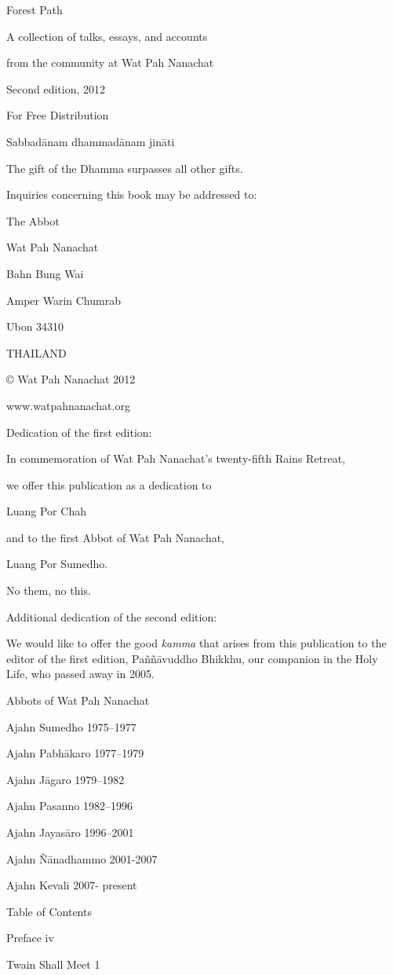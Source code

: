 Forest Path

A collection of talks, essays, and accounts

from the community at Wat Pah Nanachat

Second edition, 2012

For Free Distribution

Sabbadānam dhammadānam jināti

The gift of the Dhamma surpasses all other gifts.

Inquiries concerning this book may be addressed to:

The Abbot

Wat Pah Nanachat

Bahn Bung Wai

Amper Warin Chumrab

Ubon 34310

THAILAND

© Wat Pah Nanachat 2012

www.watpahnanachat.org

Dedication of the first edition:

In commemoration of Wat Pah Nanachat's twenty-fifth Rains Retreat,

we offer this publication as a dedication to

Luang Por Chah

and to the first Abbot of Wat Pah Nanachat,

Luang Por Sumedho.

No them, no this.

Additional dedication of the second edition:

We would like to offer the good \emph{kamma} that arises from this
publication to the editor of the first edition, Paññāvuddho Bhikkhu, our
companion in the Holy Life, who passed away in 2005.

Abbots of Wat Pah Nanachat

Ajahn Sumedho 1975--1977

Ajahn Pabhākaro 1977--1979

Ajahn Jāgaro 1979--1982

Ajahn Pasanno 1982--1996

Ajahn Jayasāro 1996--2001

Ajahn Ñānadhammo 2001-2007

Ajahn Kevali 2007- present

Table of Contents

Preface iv

Twain Shall Meet 1

